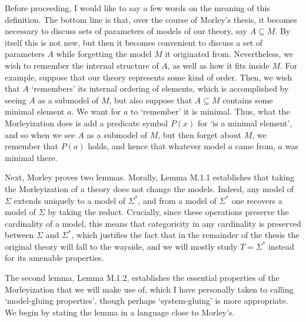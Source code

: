 \documentclass{article}
\theoremstyle{nonumberplain}
\begin{document}
Before proceeding, I would like to say a few words on the meaning of this definition. The bottom line is that, over the course of Morley's thesis, it becomes necessary to discuss sets of parameters of models of our theory, say $A \subseteq M$. By itself this is not new, but then it becomes convenient to discuss a set of parameters $A$ while forgetting the model $M$ it originated from. Nevertheless, we wish to remember the internal structure of $A$, as well as how it fits inside $M$. For example, suppose that our theory represents some kind of order. Then, we wish that $A$ `remembers' its internal ordering of elements, which is accomplished by seeing $A$ as a submodel of $M$, but also suppose that $A \subseteq M$ contains some minimal element $a$. We want for $a$ to `remember' it is minimal. Thus, what the Morleyization does is add a predicate symbol $P(x)$ for `is a minimal element', and so when we see $A$ as a submodel of $M$, but then forget about $M$, we remember that $P(a)$ holds, and hence that whatever model $a$ came from, $a$ was minimal there.

Next, Morley proves two lemmas. Morally, Lemma M.1.1 establishes that taking the Morleyization of a theory does not change the models. Indeed, any model of $\Sigma$ extends uniquely to a model of $\Sigma^*$, and from a model of $\Sigma^*$ one recovers a model of $\Sigma$ by taking the reduct. Crucially, since these operations preserve the cardinality of a model, this means that categoricity in any cardinality is preserved between $\Sigma$ and $\Sigma^*$, which justifies the fact that in the remainder of the thesis the original theory will fall to the wayside, and we will mostly study $T = \Sigma^*$ instead for its amenable properties.

The second lemma, Lemma M.1.2, establishes the essential properties of the Morleyization that we will make use of, which I have personally taken to calling `model-gluing properties', though perhaps `system-gluing' is more appropriate. We begin by stating the lemma in a language close to Morley's.
\end{document}
